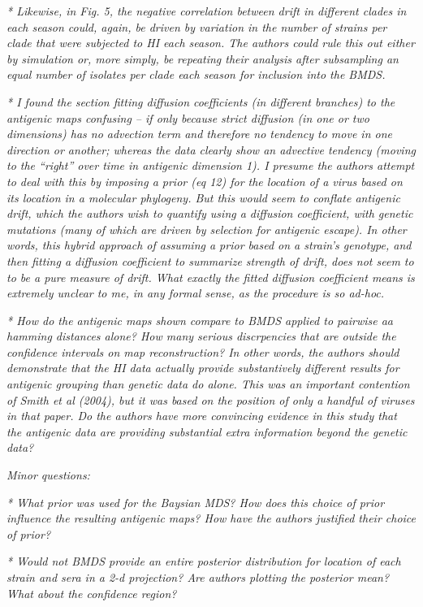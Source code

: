 \documentclass[11pt,oneside,letterpaper]{article}
\begin{document}
\textsl{* Likewise, in Fig. 5, the negative correlation between drift in different clades in each season could, again, be driven by variation in the number of strains per clade that were subjected to HI each season. The authors could rule this out either by simulation or, more simply, be repeating their analysis after subsampling an equal number of isolates per clade each season for inclusion into the BMDS.}

\textsl{* I found the section fitting diffusion coefficients (in different branches) to the antigenic maps confusing -- if only because strict diffusion (in one or two dimensions) has no advection term and therefore no tendency to move in one direction or another; whereas the data clearly show an advective tendency (moving to the ``right'' over time in antigenic dimension 1). I presume the authors attempt to deal with this by imposing a prior (eq 12) for the location of a virus based on its location in a molecular phylogeny. But this would seem to conflate antigenic drift, which the authors wish to quantify using a diffusion coefficient, with genetic mutations (many of which are driven by selection for antigenic escape). In other words, this hybrid approach of assuming a prior based on a strain's genotype, and then fitting a diffusion coefficient to summarize strength of drift, does not seem to to be a pure measure of drift. What exactly the fitted diffusion coefficient means is extremely unclear to me, in any formal sense, as the procedure is so ad-hoc.}

\textsl{* How do the antigenic maps shown compare to BMDS applied to pairwise aa hamming distances alone? How many serious discrpencies that are outside the confidence intervals on map reconstruction? In other words, the authors should demonstrate that the HI data actually provide substantively different results for antigenic grouping than genetic data do alone. This was an important contention of Smith et al (2004), but it was based on the position of only a handful of viruses in that paper. Do the authors have more convincing evidence in this study that the antigenic data are providing substantial extra information beyond the genetic data?}

\textsl{Minor questions:}

\textsl{* What prior was used for the Baysian MDS? How does this choice of prior influence the resulting antigenic maps? How have the authors justified their choice of prior?}

\textsl{* Would not BMDS provide an entire posterior distribution for location of each strain and sera in a 2-d projection? Are authors plotting the posterior mean? What about the confidence region?}
\end{document}
